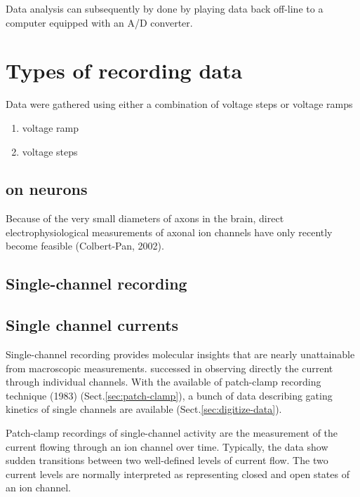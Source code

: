 Data analysis can subsequently by done by playing data back off-line to a
computer equipped with an A/D converter.



\section{Types of recording data}

Data were gathered using either a combination of voltage steps or voltage ramps
\begin{enumerate}
  \item voltage ramp

  \item voltage steps
\end{enumerate}




\subsection{on neurons}

Because of the very small diameters of axons in the brain, direct
electrophysiological measurements of axonal ion channels have only recently
become feasible (Colbert-Pan, 2002).


\subsection{Single-channel recording}
\label{sec:single_channel_recording}

\subsection{Single channel currents}

Single-channel recording provides molecular insights that are nearly
unattainable from macroscopic measurements.
\citep{neher1976} successed in observing directly the current through individual
channels. With the available of patch-clamp recording technique (1983)
(Sect.\ref{sec:patch-clamp}), a bunch of data describing gating kinetics of
single channels are available (Sect.\ref{sec:digitize-data}).

Patch-clamp recordings of single-channel activity are the measurement of the
current flowing through an ion channel over time. Typically, the data show
sudden transitions between two well-defined levels of current flow. The two
current levels are normally interpreted as representing closed and open states
of an ion channel.



